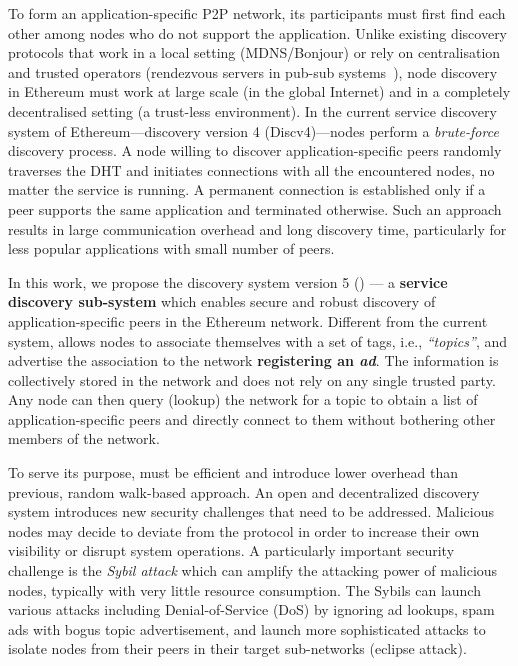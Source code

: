  To form an application-specific P2P network, its participants must first find each other among nodes who do not support the application. 
Unlike existing discovery protocols that work in a local setting (MDNS/Bonjour) or rely on centralisation and trusted operators (\eg rendezvous servers in pub-sub systems~\cite{}), node discovery in Ethereum must work at large scale (in the global Internet) and in a completely decentralised setting  (\ie a trust-less environment). 
In the current service discovery system of Ethereum---\ie discovery version 4 (Discv4)---nodes perform a \textit{brute-force} discovery process. 
A node willing to discover application-specific peers randomly traverses the DHT and initiates connections with all the encountered nodes, no matter the service is running.
A permanent connection is established only if a peer supports the same application and terminated otherwise. 
Such an approach results in large communication overhead and long discovery time, particularly for less popular applications with small number of peers.


 In this work, we propose the discovery system version 5 (\textit{\sysname}) --- a \textbf{service discovery sub-system} which enables secure and robust discovery of application-specific peers in the Ethereum network. Different from the current system, \sysname allows nodes to associate themselves with a set of tags, i.e., \textit{``topics''}, and advertise the association to the network \ie  \textbf{registering an \emph{ad}}. The information is collectively stored in the network and does not rely on any single trusted party. Any node can then query (\ie lookup) the network for a topic to obtain a list of application-specific peers and directly connect to them without bothering other members of the network. 

To serve its purpose, \sysname must be efficient and introduce lower overhead than previous, random walk-based approach. An open and decentralized discovery system introduces new security challenges that need to be addressed. Malicious nodes may decide to deviate from the protocol in order to increase their own visibility or disrupt system operations. A particularly important security challenge is the \textit{Sybil attack} which can amplify the attacking power of malicious nodes, typically with very little resource consumption. The Sybils can launch various attacks including Denial-of-Service (DoS) by ignoring ad lookups, spam ads with bogus topic advertisement, and launch more sophisticated attacks to isolate nodes from their peers in their target sub-networks (\ie eclipse attack). 

